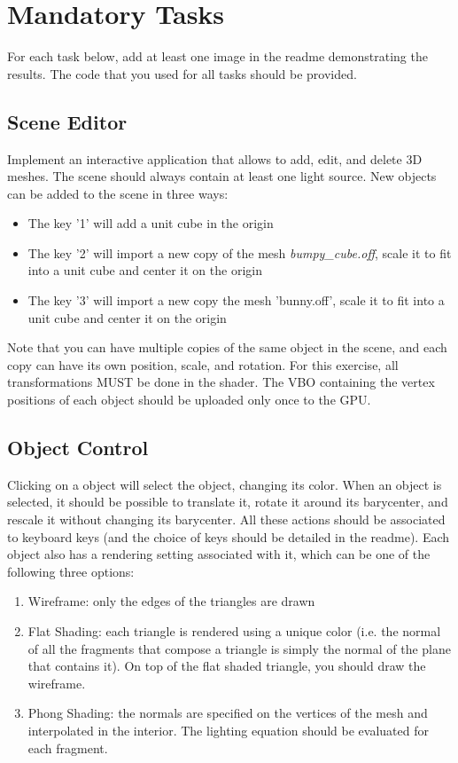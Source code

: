 \documentclass[11pt]{article}
\begin{document}
\section{Mandatory Tasks}
For each task below, add at least one image in the readme demonstrating the results. The code that you used for all tasks should be provided.

\subsection{Scene Editor}

Implement an interactive application that allows to add, edit, and delete 3D meshes. The scene should always contain at least one light source. New objects can be added to the scene in three ways:
\begin{itemize}
\item The key '1' will add a unit cube in the origin
\item The key '2' will import a new copy of the mesh \emph{bumpy\_cube.off}, scale it to fit into a unit cube and center it on the origin
\item The key '3' will import a new copy the mesh 'bunny.off', scale it to fit into a unit cube and center it on the origin
\end{itemize}

Note that you can have multiple copies of the same object in the scene, and each copy can have its own position, scale, and rotation.
%
For this exercise, all transformations MUST be done in the shader. The VBO containing the vertex positions of each object should be uploaded only once to the GPU. 

\subsection{Object Control}

Clicking on a object will select the object, changing its color. When an object is selected, it should be possible to translate it, rotate it around its barycenter, and rescale it without changing its barycenter. All these actions should be associated to keyboard keys (and the choice of keys should be detailed in the readme).
%
Each object also has a rendering setting associated with it, which can be one of the following three options:
\begin{enumerate}
	\item Wireframe: only the edges of the triangles are drawn
	\item Flat Shading: each triangle is rendered using a unique color (i.e. the normal of all the fragments that compose a triangle is simply the normal of the plane that contains it). On top of the flat shaded triangle, you should draw the wireframe.
	\item Phong Shading: the normals are specified on the vertices of the mesh and interpolated in the interior. The lighting equation should be evaluated for each fragment.
\end{enumerate}
\end{document}
